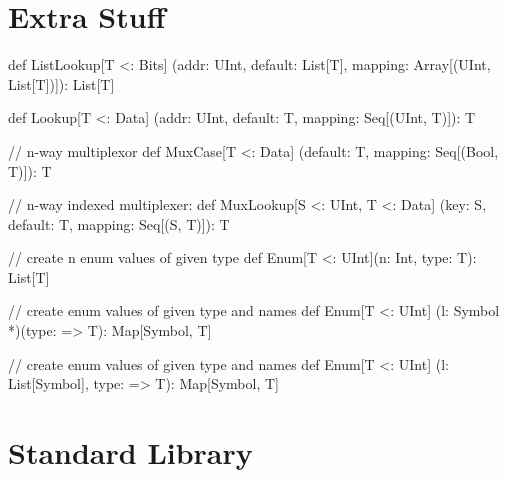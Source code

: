 \documentclass[10pt,twocolumn]{article}
\begin{document}
\section{Extra Stuff}

\lstset{language=scala}

\begin{scala}
def ListLookup[T <: Bits]
  (addr: UInt, default: List[T], 
   mapping: Array[(UInt, List[T])]): List[T]

def Lookup[T <: Data]
  (addr: UInt, default: T, 
   mapping: Seq[(UInt, T)]): T

// n-way multiplexor
def MuxCase[T <: Data] 
  (default: T, mapping: Seq[(Bool, T)]): T

// n-way indexed multiplexer:
def MuxLookup[S <: UInt, T <: Data] 
  (key: S, default: T, mapping: Seq[(S, T)]): T
\end{scala}


\begin{scala}
// create n enum values of given type
def Enum[T <: UInt](n: Int, type: T): List[T]

// create enum values of given type and names
def Enum[T <: UInt]
  (l: Symbol *)(type: => T): Map[Symbol, T]

// create enum values of given type and names
def Enum[T <: UInt]
  (l: List[Symbol], type: => T): Map[Symbol, T]
\end{scala}

% 

\section{Standard Library}
\end{document}
